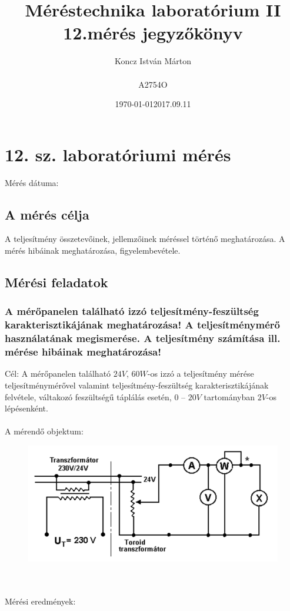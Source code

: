 \documentclass[10pt,a4paper]{article}
\begin{document}
\title{Méréstechnika laboratórium II 12.mérés jegyzőkönyv}
\author{Koncz István Márton\\\\A2754O}
\date{\today}
\maketitle
\newpage
\section{12. sz. laboratóriumi mérés}
	Mérés dátuma:\date{2017.09.11}
	\subsection{A mérés célja}
	A teljesítmény összetevőinek, jellemzőinek méréssel történő meghatározása.
A mérés hibáinak meghatározása, figyelembevétele.
	\subsection{Mérési feladatok}
		\subsubsection{A mérőpanelen található izzó teljesítmény-feszültség karakterisztikájának meghatározása! A teljesítménymérő
használatának megismerése.
A teljesítmény számítása ill. mérése hibáinak
meghatározása!}
Cél: A mérőpanelen található $24 V$, $60 W$-os izzó a
teljesítmény mérése teljesítménymérővel valamint
teljesítmény-feszültség karakterisztikájának
felvétele, váltakozó feszültségű táplálás esetén, $0$ –
$20 V$ tartományban $2 V$-os lépésenként.\\\\
A mérendő objektum:\begin{figure}[hbtp]
\centering
\includegraphics[scale=0.5]{Toroid.png}
\caption{}
\end{figure}\\\\
Mérési eredmények:
\end{document}
